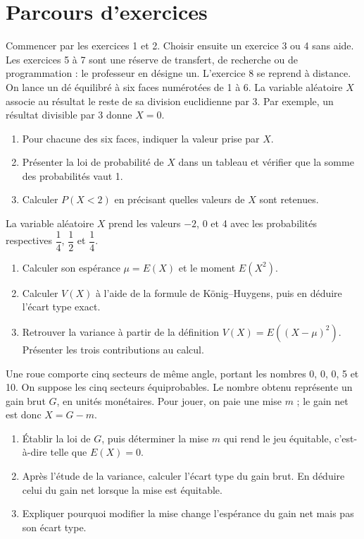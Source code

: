 \section*{Parcours d’exercices}\label{C08-PARC}
Commencer par les exercices 1 et 2. Choisir ensuite un exercice 3 ou 4 sans aide. Les exercices 5 à 7 sont une réserve de transfert, de recherche ou de programmation : le professeur en désigne un. L’exercice 8 se reprend à distance.
\begingroup
{}
On lance un dé équilibré à six faces numérotées de 1 à 6. La variable aléatoire $X$ associe au résultat le reste de sa division euclidienne par 3. Par exemple, un résultat divisible par 3 donne $X=0$.
\begin{enumerate}[label=\arabic*.]
\item Pour chacune des six faces, indiquer la valeur prise par $X$.
\item Présenter la loi de probabilité de $X$ dans un tableau et vérifier que la somme des probabilités vaut 1.
\item Calculer $P(X<2)$ en précisant quelles valeurs de $X$ sont retenues.
\end{enumerate}
La variable aléatoire $X$ prend les valeurs $-2$, 0 et 4 avec les probabilités respectives $\dfrac14$, $\dfrac12$ et $\dfrac14$.
\begin{enumerate}[label=\arabic*.]
\item Calculer son espérance $\mu=E(X)$ et le moment $E(X^2)$.
\item Calculer $V(X)$ à l’aide de la formule de König–Huygens, puis en déduire l’écart type exact.
\item Retrouver la variance à partir de la définition $V(X)=E((X-\mu)^2)$. Présenter les trois contributions au calcul.
\end{enumerate}
Une roue comporte cinq secteurs de même angle, portant les nombres 0, 0, 0, 5 et 10. On suppose les cinq secteurs équiprobables. Le nombre obtenu représente un gain brut $G$, en unités monétaires. Pour jouer, on paie une mise $m$ ; le gain net est donc $X=G-m$.
\begin{enumerate}[label=\arabic*.]
\item Établir la loi de $G$, puis déterminer la mise $m$ qui rend le jeu équitable, c’est-à-dire telle que $E(X)=0$.
\item Après l’étude de la variance, calculer l’écart type du gain brut. En déduire celui du gain net lorsque la mise est équitable.
\item Expliquer pourquoi modifier la mise change l’espérance du gain net mais pas son écart type.
\end{enumerate}
